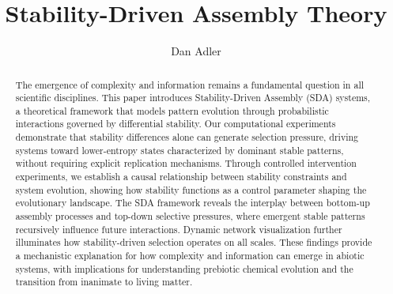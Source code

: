 \documentclass[preprint,12pt]{elsarticle}
\begin{document}
\begin{frontmatter}



\title{Stability-Driven Assembly Theory}


\author{Dan Adler} %


\begin{abstract}
The emergence of complexity and information remains a fundamental question in all scientific disciplines. This paper introduces Stability-Driven Assembly (SDA) systems, a theoretical framework that models pattern evolution through probabilistic interactions governed by differential stability. Our computational experiments demonstrate that stability differences alone can generate selection pressure, driving systems toward lower-entropy states characterized by dominant stable patterns, without requiring explicit replication mechanisms. Through controlled intervention experiments, we establish a causal relationship between stability constraints and system evolution, showing how stability functions as a control parameter shaping the evolutionary landscape. The SDA framework reveals the interplay between bottom-up assembly processes and top-down selective pressures, where emergent stable patterns recursively influence future interactions. Dynamic network visualization further illuminates how stability-driven selection operates on all scales. These findings provide a mechanistic explanation for how complexity and information can emerge in abiotic systems, with implications for understanding prebiotic chemical evolution and the transition from inanimate to living matter.
\end{abstract}



\end{frontmatter}
\end{document}
